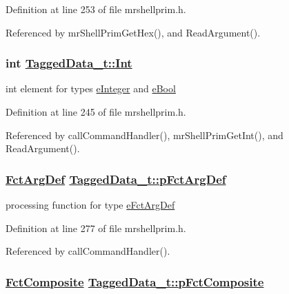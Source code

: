 Definition at line 253 of file mrshellprim.h.

Referenced by mr\-Shell\-Prim\-Get\-Hex(), and Read\-Argument().\hypertarget{structTaggedData__t_bd711fd71d65cb2aa3f10d8e6793707d}{
\subsubsection[Int]{\setlength{\rightskip}{0pt plus 5cm}int \hyperlink{structTaggedData__t_bd711fd71d65cb2aa3f10d8e6793707d}{Tagged\-Data\_\-t::Int}}}
\label{structTaggedData__t_bd711fd71d65cb2aa3f10d8e6793707d}


int element for types \hyperlink{mrshellprim_8h_76a810650461f2062938ee9b82666b36dd647739976fe8f17c25e3fe04d30eeb}{e\-Integer} and \hyperlink{mrshellprim_8h_76a810650461f2062938ee9b82666b365461a9e2704387e11258e14a0b41ac1a}{e\-Bool} 



Definition at line 245 of file mrshellprim.h.

Referenced by call\-Command\-Handler(), mr\-Shell\-Prim\-Get\-Int(), and Read\-Argument().\hypertarget{structTaggedData__t_6a4dac68cc3f46afeb1c668dd7f0fdd8}{
\subsubsection[pFctArgDef]{\setlength{\rightskip}{0pt plus 5cm}\hyperlink{mrshellprim_8h_1c9f7567aaf5693ef8473ff91ccb8ff5}{Fct\-Arg\-Def} \hyperlink{structTaggedData__t_6a4dac68cc3f46afeb1c668dd7f0fdd8}{Tagged\-Data\_\-t::p\-Fct\-Arg\-Def}}}
\label{structTaggedData__t_6a4dac68cc3f46afeb1c668dd7f0fdd8}


processing function for type \hyperlink{mrshellprim_8h_76a810650461f2062938ee9b82666b3607fd24779fbb8e0bc12b8241e0e436cc}{e\-Fct\-Arg\-Def} 



Definition at line 277 of file mrshellprim.h.

Referenced by call\-Command\-Handler().\hypertarget{structTaggedData__t_1d4925d2fd17d10226af14b97963366c}{
\subsubsection[pFctComposite]{\setlength{\rightskip}{0pt plus 5cm}\hyperlink{mrshellprim_8h_fdf1e7a245d5ec6ac61d531e07e6a33c}{Fct\-Composite} \hyperlink{structTaggedData__t_1d4925d2fd17d10226af14b97963366c}{Tagged\-Data\_\-t::p\-Fct\-Composite}}}
\label{structTaggedData__t_1d4925d2fd17d10226af14b97963366c}


